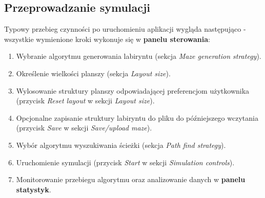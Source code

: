 \documentclass[../doc.tex]{subfiles}
\begin{document}
\subsection{Przeprowadzanie symulacji}

Typowy przebieg czynności po uruchomieniu aplikacji wygląda następująco - wszystkie wymienione kroki wykonuje się w \textbf{panelu sterowania}:

\begin{enumerate}

  \item Wybranie algorytmu generowania labiryntu (sekcja \textit{Maze generation strategy}).

  \item Określenie wielkości planszy (sekcja \textit{Layout size}).

  \item Wylosowanie struktury planszy odpowiadającej preferencjom użytkownika (przycisk \textit{Reset layout} w sekcji \textit{Layout size}).

  \item Opcjonalne zapisanie struktury labiryntu do pliku do późniejszego wczytania (przycisk \textit{Save} w sekcji \textit{Save/upload maze}).

  \item Wybór algorytmu wyszukiwania ścieżki (sekcja \textit{Path find strategy}).

  \item Uruchomienie symulacji (przycisk \textit{Start} w sekcji \textit{Simulation controls}).

  \item Monitorowanie przebiegu algorytmu oraz analizowanie danych w \textbf{panelu statystyk}.
\end{enumerate}
\end{document}
